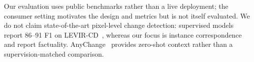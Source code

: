 Our evaluation uses public benchmarks rather than a live deployment; the
consumer setting motivates the design and metrics but is not itself evaluated.
We do not claim state-of-the-art pixel-level change detection: supervised models
report 86--91 F1 on LEVIR-CD~\cite{chen2020spatial,fang2021snunet,chen2021remote,
bandara2022transformer,codegoni2023tinycd}, whereas our focus is instance
correspondence and report factuality. AnyChange~\cite{zheng2024segment} provides
zero-shot context rather than a supervision-matched comparison.

